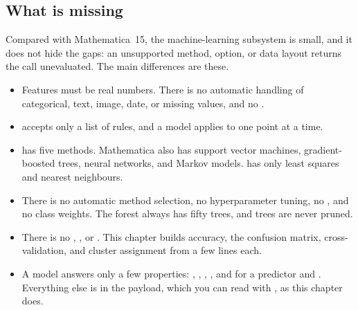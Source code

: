 
\subsection*{What is missing}

Compared with Mathematica~15, the machine-learning subsystem is small, and it
does not hide the gaps: an unsupported method, option, or data layout returns the
call unevaluated. The main differences are these.

\begin{itemize}
\item Features must be real numbers. There is no automatic handling of
  categorical, text, image, date, or missing values, and no
  .
\item {} accepts only a list of rules, and a model applies to one point
  at a time.
\item {} has five methods. Mathematica also has support vector machines,
  gradient-boosted trees, neural networks, and Markov models.  has only
  least squares and nearest neighbours.
\item There is no automatic method selection, no hyperparameter tuning, no
  , and no class weights. The forest always has fifty trees,
  and trees are never pruned.
\item There is no , ,
  or . This chapter builds accuracy, the confusion matrix,
  cross-validation, and cluster assignment from a few lines each.
\item A model answers only a few properties: ,
  , , , and for a
  predictor  and . Everything else is
  in the payload, which you can read with , as this chapter does.
\end{itemize}

